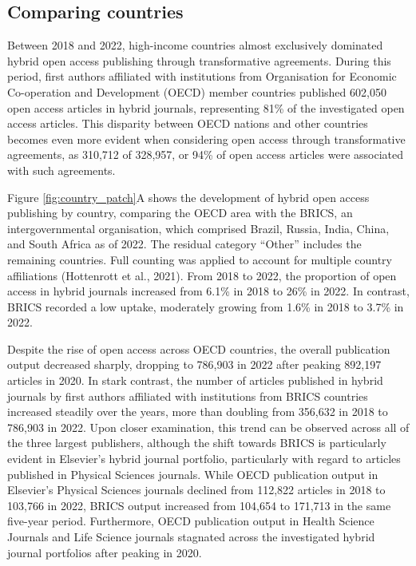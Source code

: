 \documentclass[a4paper,man,floatsintext,longtable,noextraspace,12pt]{apa6}
\begin{document}
\hypertarget{comparing-countries}{%
\subsection{Comparing countries}\label{comparing-countries}}

Between 2018 and 2022, high-income countries almost exclusively
dominated hybrid open access publishing through transformative
agreements. During this period, first authors affiliated with
institutions from Organisation for Economic Co-operation and Development
(OECD) member countries published 602,050 open access articles in hybrid
journals, representing 81\% of the investigated open access articles.
This disparity between OECD nations and other countries becomes even
more evident when considering open access through transformative
agreements, as 310,712 of 328,957, or 94\% of open access articles were
associated with such agreements.

Figure \ref{fig:country_patch}A shows the development of hybrid open
access publishing by country, comparing the OECD area with the BRICS, an
intergovernmental organisation, which comprised Brazil, Russia, India,
China, and South Africa as of 2022. The residual category ``Other''
includes the remaining countries. Full counting was applied to account
for multiple country affiliations (Hottenrott et al., 2021). From 2018
to 2022, the proportion of open access in hybrid journals increased from
6.1\% in 2018 to 26\% in 2022. In contrast, BRICS recorded a low uptake,
moderately growing from 1.6\% in 2018 to 3.7\% in 2022.

Despite the rise of open access across OECD countries, the overall
publication output decreased sharply, dropping to 786,903 in 2022 after
peaking 892,197 articles in 2020. In stark contrast, the number of
articles published in hybrid journals by first authors affiliated with
institutions from BRICS countries increased steadily over the years,
more than doubling from 356,632 in 2018 to 786,903 in 2022. Upon closer
examination, this trend can be observed across all of the three largest
publishers, although the shift towards BRICS is particularly evident in
Elsevier's hybrid journal portfolio, particularly with regard to
articles published in Physical Sciences journals. While OECD publication
output in Elsevier's Physical Sciences journals declined from 112,822
articles in 2018 to 103,766 in 2022, BRICS output increased from 104,654
to 171,713 in the same five-year period. Furthermore, OECD publication
output in Health Science Journals and Life Science journals stagnated
across the investigated hybrid journal portfolios after peaking in 2020.
\end{document}
